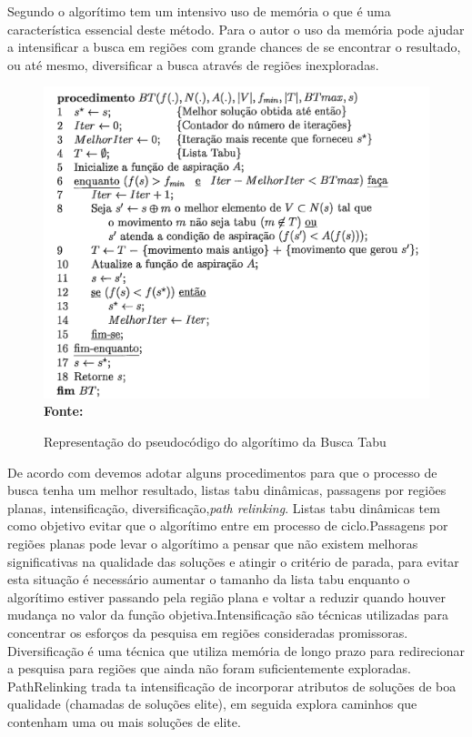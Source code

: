 
Segundo \cite{armentanointroduccao}  o algorítimo tem um intensivo uso de memória o que é uma característica essencial deste método. Para o autor o uso da memória pode ajudar a intensificar a busca em regiões com grande chances de se encontrar o resultado, ou até mesmo, diversificar a busca através de regiões inexploradas.
\begin{figure}[!htb]
\caption[Representação do pseudocódigo do algorítimo da Busca Tabu]{Representação do pseudocódigo do algorítimo da Busca Tabu}
\label{fig:figura2}
\centering
\includegraphics[scale=0.50]{imagens/representacaoBuscaTabu.png}
\\ \textbf{\footnotesize Fonte: \cite{souza2000}}
\end{figure}

De acordo com \cite{armentanointroduccao}  devemos adotar alguns procedimentos para que o processo de busca tenha um melhor resultado, listas tabu dinâmicas, passagens por regiões planas, intensificação, diversificação,\textit{path relinking}. Listas tabu dinâmicas tem como objetivo evitar que o algorítimo entre em processo de ciclo.Passagens por regiões planas pode levar o algorítimo a pensar que não existem melhoras significativas na qualidade das soluções e atingir o critério de parada, para evitar esta situação é necessário aumentar o tamanho da lista tabu enquanto o algorítimo estiver passando pela região plana e voltar a reduzir quando houver mudança no valor da função objetiva.Intensificação são técnicas utilizadas para concentrar os esforços da pesquisa em regiões consideradas promissoras. Diversificação é uma técnica que utiliza memória de longo prazo para redirecionar a pesquisa para regiões que ainda não foram suficientemente exploradas. PathRelinking trada ta intensificação de incorporar atributos de soluções de boa qualidade (chamadas de soluções elite), em seguida explora caminhos que contenham uma ou mais soluções de elite.

